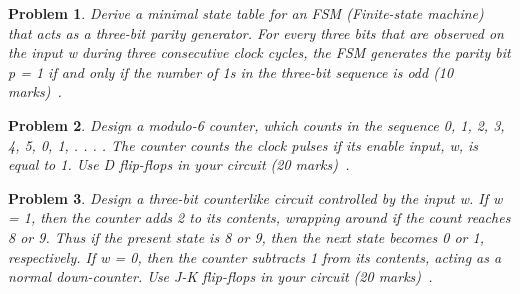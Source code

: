 \documentclass[twocolumn]{article}
\newtheorem{prob}{Problem}
\begin{document}
\begin{prob}
  Derive a minimal state table for an FSM (Finite-state machine) that acts as a
three-bit parity generator. For every three bits that are observed on the input
w during three consecutive clock cycles, the FSM generates the parity bit p = 1
if and only if the number of 1s in the three-bit sequence is odd (10
marks)~\cite[Prob 6.12]{brown2013fundamentals}.
\end{prob}

\begin{prob}
  Design a modulo-6 counter, which counts in the sequence 0, 1, 2, 3, 4, 5, 0,
1, . . . . The counter counts the clock pulses if its enable input, w, is equal
to 1. Use D flip-flops in your circuit (20 marks)~\cite[Prob 6.23]{brown2013fundamentals}.
\end{prob}


\begin{prob}
  Design a three-bit counterlike circuit controlled by the input w. If w = 1,
then the counter adds 2 to its contents, wrapping around if the count reaches 8
or 9. Thus if the present state is 8 or 9, then the next state becomes 0 or 1,
respectively. If w = 0, then the counter subtracts 1 from its contents, acting
as a normal down-counter. Use J-K flip-flops in your circuit (20
marks)~\cite[Prob 6.26]{brown2013fundamentals}.
\end{prob}



\end{document}
